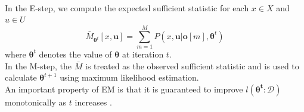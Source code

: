 \documentclass [11pt]{article}
\begin{document}
\\
In the E-step, we compute the expected sufficient statistic for each $x\in X$ and $u \in U$
\begin{equation*}
\bar{M}_{\boldsymbol{\theta}^{t}}[x,\boldsymbol{u}] = \sum_{m=1}^{M}P(x,\boldsymbol{u}|\boldsymbol{o}[m],\boldsymbol{\theta}^{t})
\end{equation*}
where $\boldsymbol{\theta}^{t}$ denotes the value of $\boldsymbol{\theta}$ at iteration $t$.
\\
In the M-step, the $\bar{M}$ is treated as the observed sufficient statistic and is used to calculate $\boldsymbol{\theta}^{t+1}$ using maximum likelihood estimation.
\\
An important property of EM is that it is guaranteed to improve $l(\boldsymbol{\theta^{t}}:\mathcal{D})$ monotonically as $t$ increases \citep{koller09}.
\end{document}
